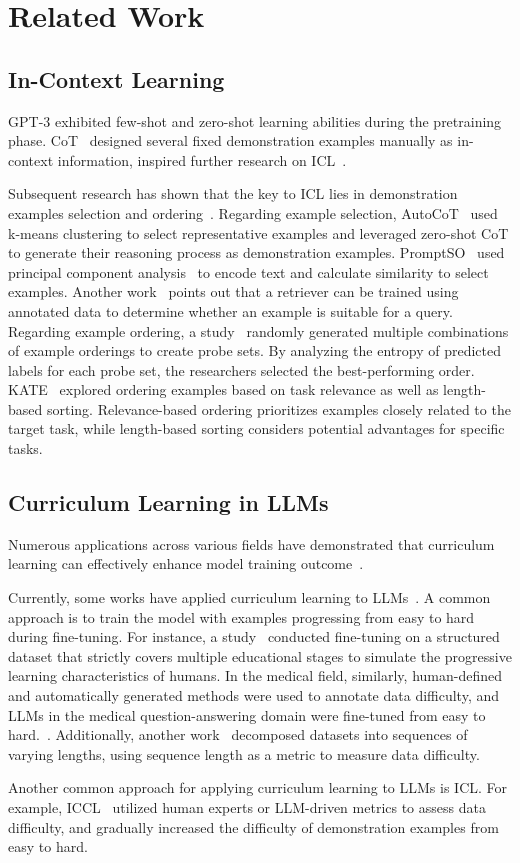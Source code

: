 \section{Related Work}
\subsection{In-Context Learning}
GPT-3 \cite{firstfewshot} exhibited few-shot and zero-shot learning abilities during the pretraining phase.
CoT~\cite{cot} designed several fixed demonstration examples manually as in-context information, inspired further research on ICL~\cite{cot_future1}.

Subsequent research has shown that the key to ICL lies in demonstration examples selection and ordering~\cite{relatedwork_icl1,relatedwork_icl2,relatedwork_icl3}.
Regarding example selection, AutoCoT~\cite{autocot} used k-means clustering to select representative examples and leveraged zero-shot CoT to generate their reasoning process as demonstration examples.
PromptSO~\cite{promptso} used principal component analysis~\cite{pca} to encode text and calculate similarity to select examples.
Another work~\cite{promot_retrieve} points out that a retriever can be trained using annotated data to determine whether an example is suitable for a query.
Regarding example ordering, a study~\cite{order} randomly generated multiple combinations of example orderings to create probe sets.
By analyzing the entropy of predicted labels for each probe set, the researchers selected the best-performing order.
KATE~\cite{kate} explored ordering examples based on task relevance as well as length-based sorting.
Relevance-based ordering prioritizes examples closely related to the target task, while length-based sorting considers potential advantages for specific tasks.


\subsection{Curriculum Learning in LLMs}
Numerous applications across various fields have demonstrated that curriculum learning can effectively enhance model training outcome~\cite{curriculum2,curriculum_survey}.

Currently, some works have applied curriculum learning to LLMs~\cite{relatedwork_cl1, relatedwork_cl2}.
A common approach is to train the model with examples progressing from easy to hard during fine-tuning.
For instance, a study~\cite{humancurriculum} conducted fine-tuning on a structured dataset that strictly covers multiple educational stages to simulate the progressive learning characteristics of humans.
In the medical field, similarly, human-defined and automatically generated methods were used to annotate data difficulty, and LLMs in the medical question-answering domain were fine-tuned from easy to hard.~\cite{humancurriculum}.
Additionally, another work~\cite{datasetdecomposition} decomposed datasets into sequences of varying lengths, using sequence length as a metric to measure data difficulty.

Another common approach for applying curriculum learning to LLMs is ICL.
For example, ICCL~\cite{iccl} utilized human experts or LLM-driven metrics to assess data difficulty, and gradually increased the difficulty of demonstration examples from easy to hard.